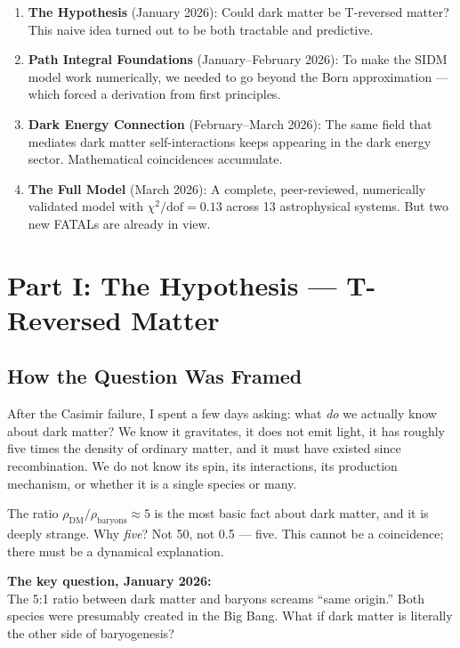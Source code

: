 \documentclass[12pt, a4paper]{article}
\newcommand{\dateentry}[1]{\medskip\noindent{\footnotesize\color{journalgray}\textbf{Date:}~#1}\smallskip}
\begin{document}
\begin{enumerate}
  \item \textbf{The Hypothesis} (January 2026): Could dark matter be T-reversed matter? This naive idea turned out to be both tractable and predictive.
  \item \textbf{Path Integral Foundations} (January--February 2026): To make the SIDM model work numerically, we needed to go beyond the Born approximation --- which forced a derivation from first principles.
  \item \textbf{Dark Energy Connection} (February--March 2026): The same field that mediates dark matter self-interactions keeps appearing in the dark energy sector. Mathematical coincidences accumulate.
  \item \textbf{The Full Model} (March 2026): A complete, peer-reviewed, numerically validated model with $\chi^2/\text{dof} = 0.13$ across 13 astrophysical systems. But two new FATALs are already in view.
\end{enumerate}

\newpage

\section{Part I: The Hypothesis --- T-Reversed Matter}

\subsection{How the Question Was Framed}

\dateentry{January 2026}

After the Casimir failure, I spent a few days asking: what \emph{do} we actually know about dark matter? We know it gravitates, it does not emit light, it has roughly five times the density of ordinary matter, and it must have existed since recombination. We do not know its spin, its interactions, its production mechanism, or whether it is a single species or many.

The ratio $\rho_\text{DM}/\rho_\text{baryons} \approx 5$ is the most basic fact about dark matter, and it is deeply strange. Why \emph{five}? Not 50, not 0.5 --- five. This cannot be a coincidence; there must be a dynamical explanation.

\begin{insightbox}
\textbf{The key question, January 2026:}\\
The 5:1 ratio between dark matter and baryons screams ``same origin.'' 
Both species were presumably created in the Big Bang. 
What if dark matter is literally the other side of baryogenesis?
\end{insightbox}
\end{document}
